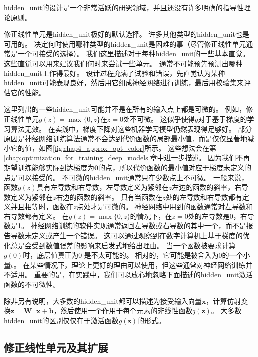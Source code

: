 
\gls{hidden_unit}的设计是一个非常活跃的研究领域，并且还没有许多明确的指导性理论原则。

修正线性单元是\gls{hidden_unit}极好的默认选择。
许多其他类型的\gls{hidden_unit}也是可用的。
决定何时使用哪种类型的\gls{hidden_unit}是困难的事（尽管修正线性单元通常是一个可接受的选择）。
我们这里描述对于每种\gls{hidden_unit}的一些基本直觉。
这些直觉可以用来建议我们何时来尝试一些单元。
通常不可能预先预测出哪种\gls{hidden_unit}工作得最好。
设计过程充满了试验和错误，先直觉认为某种\gls{hidden_unit}可能表现良好，然后用它组成神经网络进行训练，最后用校验集来评估它的性能。

这里列出的一些\gls{hidden_unit}可能并不是在所有的输入点上都是可微的。
例如，修正线性单元$g(z)=\max\{0, z\}$在$z=0$处不可微。
这似乎使得$g$对于基于梯度的学习算法无效。
在实践中，梯度下降对这些机器学习模型仍然表现得足够好。
部分原因是神经网络训练算法通常不会达到代价函数的局部最小值，而是仅仅显著地减小它的值，如图\ref{fig:chap4_approx_opt_color}所示。
这些想法会在第\ref{chap:optimization_for_training_deep_models}章中进一步描述。
因为我们不再期望训练能够实际到达梯度为$\bm{0}$的点，所以代价函数的最小值对应于梯度未定义的点是可以接受的。
不可微的\gls{hidden_unit}通常只在少数点上不可微。
一般来说，函数$g(z)$具有左导数和右导数，左导数定义为紧邻在$z$左边的函数的斜率，右导数定义为紧邻在$z$右边的函数的斜率。
只有当函数在$z$处的左导数和右导数都有定义并且相等时，函数在$z$点处才是可微的。
神经网络中用到的函数通常对左导数和右导数都有定义。
在$g(z)=\max\{0,z\}$的情况下，在$z=0$处的左导数是0，右导数是1。
神经网络训练的软件实现通常返回左导数或右导数的其中一个，而不是报告导数未定义或产生一个错误。
这可以通过观察到在数字计算机上基于梯度的优化总是会受到数值误差的影响来启发式地给出理由。
当一个函数被要求计算$g(0)$时，底层值真正为0 是不太可能的。
相对的，它可能是被舍入为0的一个小量$\epsilon$。
在某些情况下，理论上更好的理由可以使用，但这些通常对神经网络训练并不适用。
重要的是，在实践中，我们可以放心地忽略下面描述的\gls{hidden_unit}激活函数的不可微性。


除非另有说明，大多数的\gls{hidden_unit}都可以描述为接受输入向量$\bm{x}$，计算仿射变换$\bm{z}=\bm{W}^\top \bm{x}+\bm{b}$，然后使用一个作用于每个元素的非线性函数$g(\bm{z})$。
大多数\gls{hidden_unit}的区别仅仅在于激活函数$g(\bm{z})$的形式。

\subsection{修正线性单元及其扩展}
\label{sec:rectified_linear_units_and_their_generalizations}

